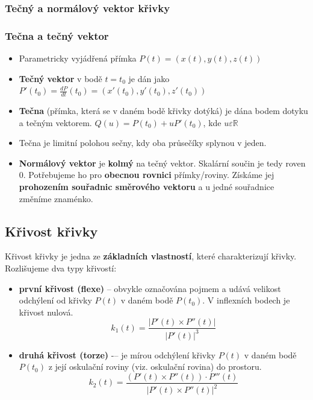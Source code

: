 \subsubsection{Tečný a normálový vektor křivky}
\subsubsection*{Tečna a tečný vektor}
\begin{itemize}
	\item Parametricky vyjádřená přímka $P(t) = (x(t), y(t), z(t))$
	\item \textbf{Tečný vektor} v bodě $t=t_0$ je dán jako $P'(t_0) = \frac{dP}{dt}(t_0) = (x'(t_0), y'(t_0), z'(t_0))$
	\item \textbf{Tečna} (přímka, která se v daném bodě křivky dotýká) je dána bodem dotyku a tečným vektorem. $Q(u) = P(t_0) + uP'(t_0)$, kde $u \varepsilon \mathbb{R}$
	\item Tečna je limitní polohou sečny, kdy oba průsečíky splynou v jeden.
\end{itemize}
\begin{itemize}
	\item \textbf{Normálový vektor} je \textbf{kolmý} na tečný vektor. Skalární součin je tedy roven 0. Potřebujeme ho pro \textbf{obecnou rovnici} přímky/roviny. Získáme jej \textbf{prohozením souřadnic směrového vektoru} a u jedné souřadnice změníme znaménko.
\end{itemize}

\subsection{Křivost křivky}
Křivost křivky je jedna ze \textbf{základních vlastností}, které charakterizují křivky. Rozlišujeme dva typy křivostí:
\begin{itemize}
	\item \textbf{první křivost (flexe)} -- obvykle označována pojmem  a udává velikost odchýlení od křivky $P(t)$ v daném bodě $P(t_0)$. V inflexních bodech je křivost nulová.
		\begin{equation*}
				k_1(t) = \frac{|P'(t) \times P''(t)|}{|P'(t)|^3}
	\end{equation*}
	\item \textbf{druhá křivost (torze)} -– je mírou odchýlení křivky $P(t)$ v daném bodě $P(t_0)$ z její oskulační roviny (viz. oskulační rovina) do prostoru.
	\begin{equation*}
				k_2(t) = \frac{(P'(t) \times P''(t)) \cdot P'''(t)}{|P'(t) \times P''(t)|^2}
	\end{equation*}
\end{itemize}
